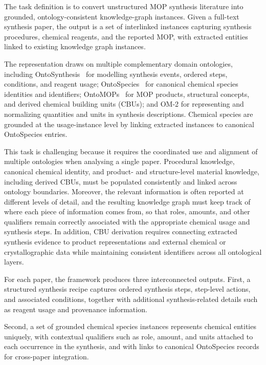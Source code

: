 The task definition is to convert unstructured MOP synthesis literature into grounded, ontology-consistent knowledge-graph instances. Given a full-text synthesis paper, the output is a set of interlinked instances capturing synthesis procedures, chemical reagents, and the reported MOP, with extracted entities linked to existing knowledge graph instances. 

The representation draws on multiple complementary domain ontologies, including OntoSynthesis~\cite{rihm2025} for modelling synthesis events, ordered steps, conditions, and reagent usage; OntoSpecies~\cite{pascazio2023} for canonical chemical species identities and identifiers; OntoMOPs~\cite{kondinski2022} for MOP products, structural concepts, and derived chemical building units (CBUs); and OM-2 for representing and normalizing quantities and units in synthesis descriptions. Chemical species are grounded at the usage-instance level by linking extracted instances to canonical OntoSpecies entries.

This task is challenging because it requires the coordinated use and alignment of multiple ontologies when analysing a single paper. Procedural knowledge, canonical chemical identity, and product- and structure-level material knowledge, including derived CBUs, must be populated consistently and linked across ontology boundaries. Moreover, the relevant information is often reported at different levels of detail, and the resulting knowledge graph must keep track of where each piece of information comes from, so that roles, amounts, and other qualifiers remain correctly associated with the appropriate chemical usage and synthesis steps. In addition, CBU derivation requires connecting extracted synthesis evidence to product representations and external chemical or crystallographic data while maintaining consistent identifiers across all ontological layers.

For each paper, the framework produces three interconnected outputs.  
First, a structured synthesis recipe captures ordered synthesis steps, step-level actions, and associated conditions, together with additional synthesis-related details such as reagent usage and provenance information.

Second, a set of grounded chemical species instances represents chemical entities uniquely, with contextual qualifiers such as role, amount, and units attached to each occurrence in the synthesis, and with links to canonical OntoSpecies records for cross-paper integration.

